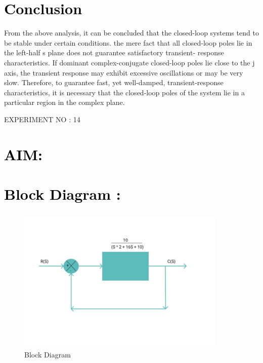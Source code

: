 \documentclass[12pt]{article}
\begin{document}
\section*{\textcolor{black}{Conclusion}}
From the above analysis, it can be concluded that the closed-loop systems tend to be stable under certain conditions. the mere fact that all closed-loop poles lie in the left-half s plane does not guarantee satisfactory transient- response characteristics. If dominant complex-conjugate closed-loop poles lie close to the j axis, the transient response may exhibit excessive oscillations or may be very slow. Therefore, to guarantee fast, yet well-damped, transient-response characteristics, it is necessary that the closed-loop poles of the system lie in a particular region in the complex plane.
 \pagebreak


\begin{center}
    \LARGE {EXPERIMENT NO : 14}
             
\end{center}

\section*{\textcolor{black}{AIM: }}

\section*{\textcolor{black}{Block Diagram :}}

\begin{figure}[!hth]
        \centering
        \includegraphics[width =10cm, height = 7cm]{images/exp141.png}
        \caption{Block Diagram}
        \label{Graph}
\end{figure}
\end{document}
